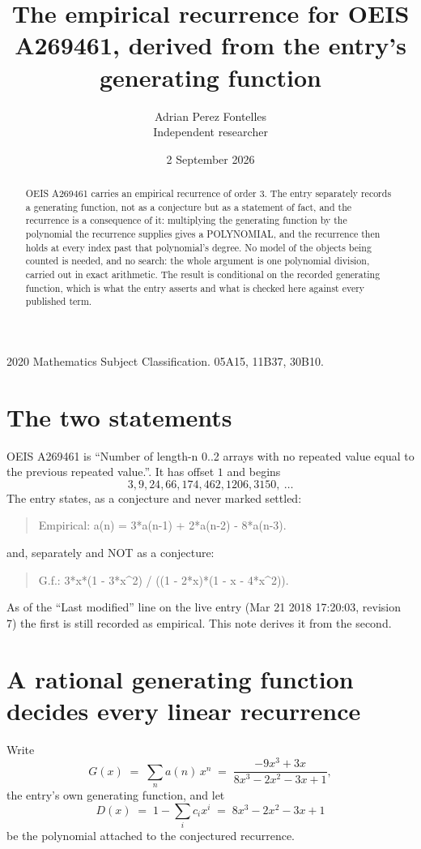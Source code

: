 \documentclass[11pt,a4paper]{article}
\title{The empirical recurrence for OEIS A269461, derived from the entry's generating function}
\author{Adrian Perez Fontelles\\ \small Independent researcher}
\date{2 September 2026}
\theoremstyle{plain}
\theoremstyle{definition}
\begin{document}
\maketitle

\begin{abstract}
OEIS A269461 carries an empirical recurrence of order $3$. The entry separately records a
generating function, not as a conjecture but as a statement of fact, and the recurrence is a
consequence of it: multiplying the generating function by the polynomial the recurrence
supplies gives a POLYNOMIAL, and the recurrence then holds at every index past that
polynomial's degree. No model of the objects being counted is needed, and no search: the
whole argument is one polynomial division, carried out in exact arithmetic. The result is
conditional on the recorded generating function, which is what the entry asserts and what is
checked here against every published term.
\end{abstract}

\noindent\small 2020 Mathematics Subject Classification. 05A15, 11B37, 30B10.\normalsize

\section{The two statements}

OEIS A269461 is ``Number of length-n 0..2 arrays with no repeated value equal to the previous repeated value.''. It has offset $1$ and begins
\[
3, 9, 24, 66, 174, 462, 1206, 3150,\ \dots
\]
The entry states, as a conjecture and never marked settled:
\begin{quote}
Empirical: a(n) = 3*a(n-1) + 2*a(n-2) - 8*a(n-3).
\end{quote}
and, separately and NOT as a conjecture:
\begin{quote}
G.f.: 3*x*(1 - 3*x\^{}2) / ((1 - 2*x)*(1 - x - 4*x\^{}2)).
\end{quote}
As of the ``Last modified'' line on the live entry (Mar 21 2018 17:20:03, revision 7) the first is still
recorded as empirical. This note derives it from the second.

\section{A rational generating function decides every linear recurrence}

Write
\[
G(x)\;=\;\sum_{n}a(n)\,x^{n}\;=\;\frac{- 9 x^{3} + 3 x}{8 x^{3} - 2 x^{2} - 3 x + 1},
\]
the entry's own generating function, and let
\[
D(x)\;=\;1-\sum_i c_i x^{i}\;=\;8 x^{3} - 2 x^{2} - 3 x + 1
\]
be the polynomial attached to the conjectured recurrence.
\end{document}
